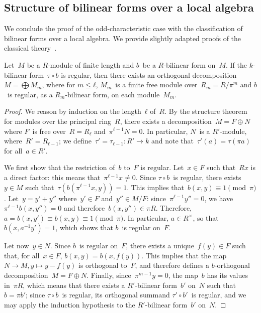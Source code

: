 \documentclass{article}%
\begin{document}
\subsection{Structure of bilinear forms over a local algebra}%

We conclude the proof of the odd-characteristic case with the
classification of bilinear forms over a local algebra.
We provide slightly adapted proofs of the classical
theory~\cite{milnorhusemoller,omeara}.

\begin{prop}\label{prop:diag-bigblock}%
Let~$M$ be a $R$-module of finite length and $b$~be a $R$-bilinear form
on~$M$.
If the $k$-bilinear form~$τ ∘ b$ is regular,
then there exists an orthogonal decomposition~$M = ⨁ M_m$,
where for $m ≤ ℓ$, $M_m$~is a finite free module over~$R_m = R / π^m$
and $b$~is regular, as a $R_m$-bilinear form, on each module~$M_m$.
\end{prop}


\begin{proof}
We reason by induction on the length~$ℓ$ of~$R$. By the structure theorem for
modules over the principal ring~$R$, there exists a decomposition~$M = F
⊕ N$ where $F$~is free over~$R = R_ℓ$ and~$π^{ℓ-1} N = 0$. In
particular, $N$~is a $R'$-module, where~$R' = R_{ℓ-1}$; we define~$τ'
= τ_{ℓ-1}: R' → k$ and note that~$τ'(a) = τ(π a)$ for all~$a ∈ R'$.

We first show that the restriction of~$b$ to~$F$ is regular. Let~$x ∈ F$
such that~$R x$ is a direct factor: this means that~$π^{ℓ-1} x ≠ 0$.
Since $τ ∘ b$~is regular, there exists~$y ∈ M$ such that~$τ(b(π^{ℓ-1} x,
y)) = 1$. This implies that~$b(x, y) ≡ 1 \pmod{π}$. Let~$y = y' + y''$
where~$y' ∈ F$ and~$y'' ∈ M/F$: since~$π^{ℓ-1} y'' = 0$, we have~$π^{ℓ-1}
b(x, y'') = 0$ and therefore~$b(x, y'') ∈ π R$. Therefore, $a = b(x, y')
≡ b(x, y) ≡ 1 \pmod{π}$. In particular, $a ∈ R^{×}$, so that~$b(x, a^{-1}
y') = 1$, which shows that $b$~is regular on~$F$.

Let now~$y ∈ N$. Since $b$~is regular on~$F$, there exists a unique~$f(y)
∈ F$ such that, for all~$x ∈ F$, $b(x, y) = b(x, f(y))$. This implies
that the map~$N → M, y ↦ y - f(y)$ is orthogonal to~$F$, and therefore
defines a $b$-orthogonal decomposition~$M = F ⊕ N$. Finally,
since~$π^{m-1} y = 0$, the map~$b$ has its values in~$π R$, which means
that there exists a $R'$-bilinear form~$b'$ on~$N$ such that~$b = π b'$;
since $τ ∘ b$~is regular, its orthogonal summand $τ' ∘ b'$~is regular,
and we may apply the induction hypothesis to the $R'$-bilinear form~$b'$
on~$N$.
\end{proof}%
\end{document}
